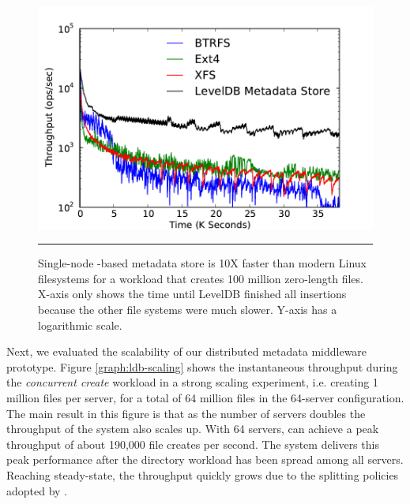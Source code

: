 \begin{figure}[t]  %
\centerline{\includegraphics[scale=0.5]{./figs/ldb_insertrate_onenode}}
\caption{
{\small 
Single-node \ldb{}-based metadata store is 10X faster than modern Linux
filesystems for a workload that creates 100 million zero-length files.
X-axis only shows the time until LevelDB finished all insertions because the other 
file systems were much slower. Y-axis has a logarithmic scale.
}
}
\vspace{10pt}
\hrule 
\label{graph:ldb-singlenode}
\end{figure}       %


Next, we evaluated the scalability of our distributed metadata middleware
prototype.
Figure \ref{graph:ldb-scaling} shows the instantaneous throughput during the 
\textit{concurrent create} workload in a strong scaling experiment, i.e.
creating 1 million files per server, for a total of 64 million files in the
64-server configuration.
The main result in this figure is that as the number of servers doubles the
throughput of the system also scales up. With 64 servers, \giga{} can achieve a
peak throughput of about 190,000 file creates per second. The system delivers
this peak performance after the directory workload has been spread among all
servers.
Reaching steady-state, the throughput quickly grows due to the splitting
policies adopted by \giga{}.

